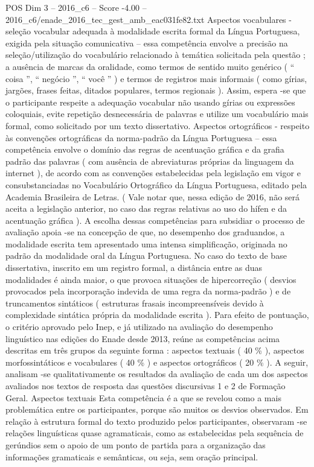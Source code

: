 \begin{textsample}{POS Dim 3 – 2016\_c6 – Score -4.00 – 2016\_c6/enade\_2016\_tec\_gest\_amb\_eac031fe82.txt}
Aspectos vocabulares - seleção vocabular adequada à modalidade escrita formal da Língua Portuguesa, exigida pela situação comunicativa – essa competência envolve a precisão na seleção/utilização do vocabulário relacionado à temática solicitada pela questão ; a ausência de marcas da oralidade, como termos de sentido muito genérico ( “ coisa ”, “ negócio ”, “ você ” ) e termos de registros mais informais ( como gírias, jargões, frases feitas, ditados populares, termos regionais ).
Assim, espera -se que o participante respeite a adequação vocabular não usando gírias ou expressões coloquiais, evite repetição desnecessária de palavras e utilize um vocabulário mais formal, como solicitado por um texto dissertativo.
Aspectos ortográficos - respeito às convenções ortográficas da norma-padrão da Língua Portuguesa – essa competência envolve o domínio das regras de acentuação gráfica e da grafia padrão das palavras ( com ausência de abreviaturas próprias da linguagem da internet ), de acordo com as convenções estabelecidas pela legislação em vigor e consubstanciadas no Vocabulário Ortográfico da Língua Portuguesa, editado pela Academia Brasileira de Letras. ( Vale notar que, nessa edição de 2016, não será aceita a legislação anterior, no caso das regras relativas ao uso do hífen e da acentuação gráfica ).
A escolha dessas competências para subsidiar o processo de avaliação apoia -se na concepção de que, no desempenho dos graduandos, a modalidade escrita tem apresentado uma intensa simplificação, originada no padrão da modalidade oral da Língua Portuguesa.
No caso do texto de base dissertativa, inscrito em um registro formal, a distância entre as duas modalidades é ainda maior, o que provoca situações de hipercorreção ( desvios provocados pela incorporação indevida de uma regra da norma-padrão ) e de truncamentos sintáticos ( estruturas frasais incompreensíveis devido à complexidade sintática própria da modalidade escrita ).
Para efeito de pontuação, o critério aprovado pelo Inep, e já utilizado na avaliação do desempenho linguístico nas edições do Enade desde 2013, reúne as competências acima descritas em três grupos da seguinte forma : aspectos textuais ( 40 \% ), aspectos morfossintáticos e vocabulares ( 40 \% ) e aspectos ortográficos ( 20 \% ).
A seguir, analisam -se qualitativamente os resultados da avaliação de cada um dos aspectos avaliados nos textos de resposta das questões discursivas 1 e 2 de Formação Geral.
Aspectos textuais Esta competência é a que se revelou como a mais problemática entre os participantes, porque são muitos os desvios observados.
Em relação à estrutura formal do texto produzido pelos participantes, observaram -se relações linguísticas quase agramaticais, como as estabelecidas pela sequência de gerúndios sem o apoio de um ponto de partida para a organização das informações gramaticais e semânticas, ou seja, sem oração principal.

\end{textsample}

